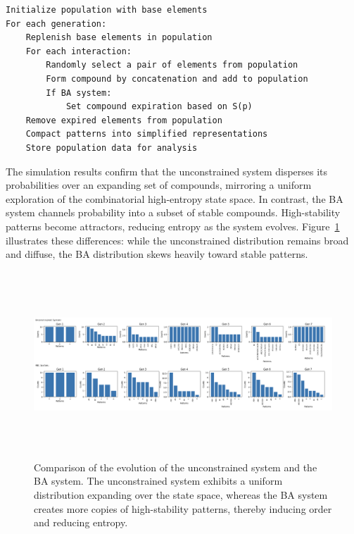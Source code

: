 \documentclass[entropy,article,submit,pdftex,moreauthors]{Definitions/mdpi}
\begin{document}
\begin{center}
\begin{minipage}{0.9\textwidth}
\ttfamily
\begin{verbatim}
Initialize population with base elements
For each generation:
    Replenish base elements in population
    For each interaction:
        Randomly select a pair of elements from population
        Form compound by concatenation and add to population
        If BA system:
            Set compound expiration based on S(p)
    Remove expired elements from population
    Compact patterns into simplified representations
    Store population data for analysis
\end{verbatim}
\end{minipage}
\end{center}
The simulation results confirm that the unconstrained system disperses its probabilities over an expanding set of compounds, mirroring a uniform exploration of the combinatorial high-entropy state space. In contrast, the BA system channels probability into a subset of stable compounds. High-stability patterns become attractors, reducing entropy as the system evolves. Figure~\ref{fig:simulation_results} illustrates these differences: while the unconstrained distribution remains broad and diffuse, the BA distribution skews heavily toward stable patterns.

\begin{figure}[h]
    \centering
    \includegraphics[width=1\textwidth,height=7cm]{monte-carlo-fits.png}
    \caption{Comparison of the evolution of the unconstrained system and the BA system. 
    The unconstrained system exhibits a uniform distribution expanding over the state space, 
    whereas the BA system creates more copies of high-stability patterns, 
    thereby inducing order and reducing entropy.}
    \label{fig:simulation_results}
\end{figure}
\end{document}

